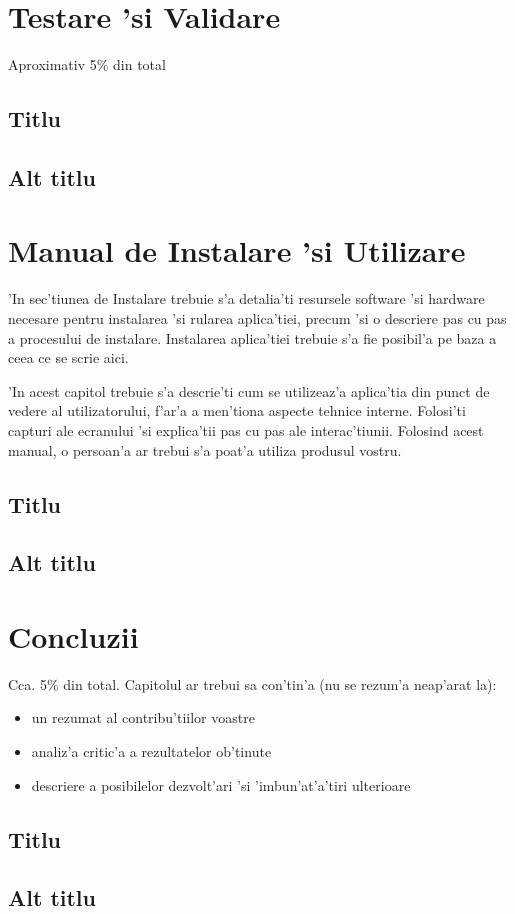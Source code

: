 \documentclass[12pt,a4paper,twoside]{report}
\begin{document}
\chapter{Testare 'si Validare}

Aproximativ 5\% din total

\section{Titlu}
\section{Alt titlu}

\chapter{Manual de Instalare 'si Utilizare}

'In sec'tiunea de Instalare trebuie s'a detalia'ti resursele software 'si hardware necesare pentru instalarea 'si rularea aplica'tiei, precum 'si o descriere pas cu pas a procesului de instalare. 
Instalarea aplica'tiei trebuie s'a fie posibil'a pe baza a ceea ce se scrie aici.

'In acest capitol trebuie s'a descrie'ti cum se utilizeaz'a aplica'tia din punct de vedere al utilizatorului, f'ar'a a men'tiona aspecte tehnice interne.
Folosi'ti capturi ale ecranului 'si explica'tii pas cu pas ale interac'tiunii. 
Folosind acest manual, o persoan'a ar trebui s'a poat'a utiliza produsul vostru.

\section{Titlu}
\section{Alt titlu}

\chapter{Concluzii}

Cca. 5\% din total.
Capitolul ar trebui sa con'tin'a (nu se rezum'a neap'arat la):
\begin{itemize}
 \item un rezumat al contribu'tiilor voastre
\item analiz'a critic'a a rezultatelor ob'tinute
\item descriere a posibilelor dezvolt'ari 'si 'imbun'at'a'tiri ulterioare
\end{itemize}


\section{Titlu}
\section{Alt titlu}


 


\end{document}
